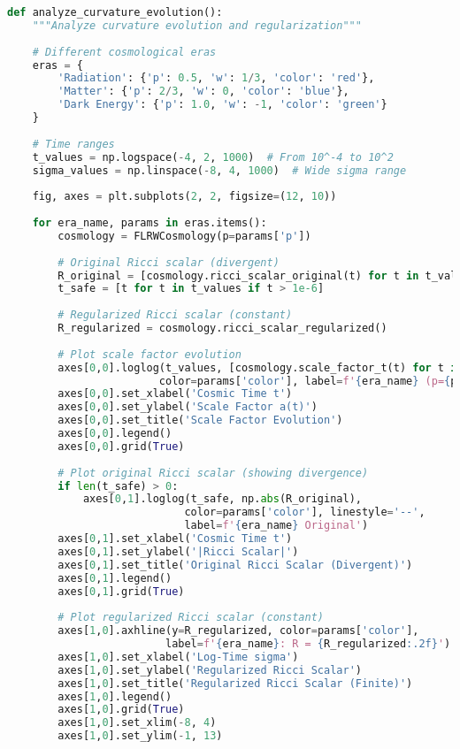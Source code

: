 \documentclass[11pt,a4paper]{article}
\begin{document}
\begin{lstlisting}[language=Python, caption=Curvature Evolution Validation]
def analyze_curvature_evolution():
    """Analyze curvature evolution and regularization"""
    
    # Different cosmological eras
    eras = {
        'Radiation': {'p': 0.5, 'w': 1/3, 'color': 'red'},
        'Matter': {'p': 2/3, 'w': 0, 'color': 'blue'},
        'Dark Energy': {'p': 1.0, 'w': -1, 'color': 'green'}
    }
    
    # Time ranges
    t_values = np.logspace(-4, 2, 1000)  # From 10^-4 to 10^2
    sigma_values = np.linspace(-8, 4, 1000)  # Wide sigma range
    
    fig, axes = plt.subplots(2, 2, figsize=(12, 10))
    
    for era_name, params in eras.items():
        cosmology = FLRWCosmology(p=params['p'])
        
        # Original Ricci scalar (divergent)
        R_original = [cosmology.ricci_scalar_original(t) for t in t_values if t > 1e-6]
        t_safe = [t for t in t_values if t > 1e-6]
        
        # Regularized Ricci scalar (constant)
        R_regularized = cosmology.ricci_scalar_regularized()
        
        # Plot scale factor evolution
        axes[0,0].loglog(t_values, [cosmology.scale_factor_t(t) for t in t_values], 
                        color=params['color'], label=f'{era_name} (p={params["p"]:.2f})')
        axes[0,0].set_xlabel('Cosmic Time t')
        axes[0,0].set_ylabel('Scale Factor a(t)')
        axes[0,0].set_title('Scale Factor Evolution')
        axes[0,0].legend()
        axes[0,0].grid(True)
        
        # Plot original Ricci scalar (showing divergence)
        if len(t_safe) > 0:
            axes[0,1].loglog(t_safe, np.abs(R_original), 
                            color=params['color'], linestyle='--', 
                            label=f'{era_name} Original')
        axes[0,1].set_xlabel('Cosmic Time t')
        axes[0,1].set_ylabel('|Ricci Scalar|')
        axes[0,1].set_title('Original Ricci Scalar (Divergent)')
        axes[0,1].legend()
        axes[0,1].grid(True)
        
        # Plot regularized Ricci scalar (constant)
        axes[1,0].axhline(y=R_regularized, color=params['color'], 
                         label=f'{era_name}: R = {R_regularized:.2f}')
        axes[1,0].set_xlabel('Log-Time sigma')
        axes[1,0].set_ylabel('Regularized Ricci Scalar')
        axes[1,0].set_title('Regularized Ricci Scalar (Finite)')
        axes[1,0].legend()
        axes[1,0].grid(True)
        axes[1,0].set_xlim(-8, 4)
        axes[1,0].set_ylim(-1, 13)
        

\end{lstlisting}
\end{document}
